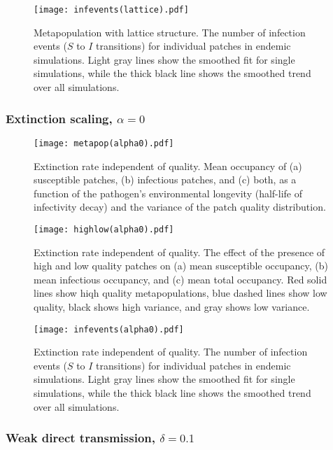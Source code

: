 \documentclass{svjour3}
\begin{document}
\begin{figure}
\centering
\texttt{[image: infevents(lattice).pdf]}
\caption{Metapopulation with lattice structure.  The number of infection events ($S$ to $I$ transitions) for individual patches in endemic simulations.  Light gray lines show the smoothed fit for single simulations, while the thick black line shows the smoothed trend over all simulations.}
\label{infections_lattice}
\end{figure}

\clearpage

\subsubsection{Extinction scaling, $\alpha = 0$}

\begin{figure}[h!]
\centering
\texttt{[image: metapop(alpha0).pdf]}
\caption{Extinction rate independent of quality.  Mean occupancy of (a) susceptible patches, (b) infectious patches, and (c) both, as a function of the pathogen's environmental longevity (half-life of infectivity decay) and the variance of the patch quality distribution.}
\label{poutcome_x0}
\end{figure}   

\begin{figure}
\centering
\texttt{[image: highlow(alpha0).pdf]}
\caption{Extinction rate independent of quality.  The effect of the presence of high and low quality patches on (a) mean susceptible occupancy, (b) mean infectious occupancy, and (c) mean total occupancy.  Red solid lines show hiqh quality metapopulations, blue dashed lines show low quality, black shows high variance, and gray shows low variance.}
\label{sens_x0}
\end{figure}

\begin{figure}
\centering
\texttt{[image: infevents(alpha0).pdf]}
\caption{Extinction rate independent of quality.  The number of infection events ($S$ to $I$ transitions) for individual patches in endemic simulations.  Light gray lines show the smoothed fit for single simulations, while the thick black line shows the smoothed trend over all simulations.}
\label{infections_x0}
\end{figure}

\clearpage

\subsubsection{Weak direct transmission, $\delta = 0.1$}
\end{document}
